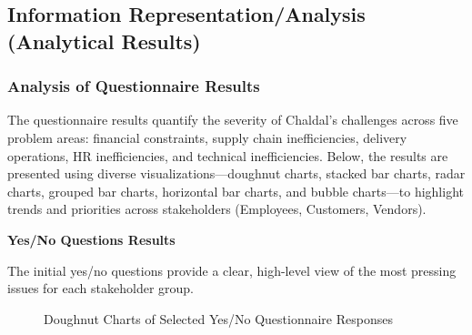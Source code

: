 \documentclass[12pt,a4paper]{article}
\begin{document}
\subsection{Information Representation/Analysis (Analytical Results)}
\subsubsection{Analysis of Questionnaire Results}
The questionnaire results quantify the severity of Chaldal's challenges across five problem areas: financial constraints, supply chain inefficiencies, delivery operations, HR inefficiencies, and technical inefficiencies. Below, the results are presented using diverse visualizations—doughnut charts, stacked bar charts, radar charts, grouped bar charts, horizontal bar charts, and bubble charts—to highlight trends and priorities across stakeholders (Employees, Customers, Vendors).

\hrulefill

\textbf{Yes/No Questions Results}

The initial yes/no questions provide a clear, high-level view of the most pressing issues for each stakeholder group.

\begin{figure}[H]
    \centering
    \begin{subfigure}{0.32\textwidth}
        \centering
        \caption{}
        \label{fig:yesno_salary_doughnut}
    \end{subfigure}
    \begin{subfigure}{0.32\textwidth}
        \centering
        \caption{}
        \label{fig:yesno_stockouts_doughnut}
    \end{subfigure}
    \begin{subfigure}{0.32\textwidth}
        \centering
        \caption{}
        \label{fig:yesno_coldchain_doughnut}
    \end{subfigure}
    \caption{Doughnut Charts of Selected Yes/No Questionnaire Responses}
    \label{fig:yesno_doughnuts}
\end{figure}
\end{document}
